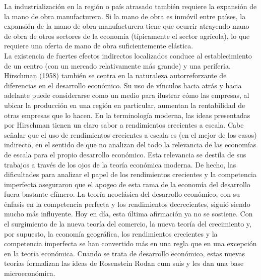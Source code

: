 La industrialización en la región o país atrasado también requiere la expansión de la mano de obra manufacturera. Si la mano de obra es inmóvil entre países, la expansión de la mano de obra manufacturera tiene que ocurrir atrayendo mano de obra de otros sectores de la economía (típicamente el sector agrícola), lo que requiere una oferta de mano de obra suficientemente elástica. \\
La existencia de fuertes efectos indirectos localizados conduce al establecimiento de un centro (con un mercado relativamente más grande) y una periferia. Hirschman (1958) también se centra en la naturaleza autorreforzante de diferencias en el desarrollo económico. Su uso de vínculos hacia atrás y hacia adelante puede considerarse como un medio para ilustrar cómo las empresas, al ubicar la producción en una región en particular, aumentan la rentabilidad de otras empresas que lo hacen. En la terminología moderna, las ideas presentadas por Hirschman tienen un claro sabor a rendimientos crecientes a escala. Cabe señalar  que el uso de rendimientos crecientes a escala es (en el mejor de los casos) indirecto, en el sentido de que no analizan del todo la relevancia de las economías de escala para el propio desarrollo económico. Esta relevancia se destila de sus trabajos a través de los ojos de la teoría económica moderna. De hecho, las dificultades para analizar el papel de los rendimientos crecientes y la competencia imperfecta aseguraron que el apogeo de esta rama de la economía del desarrollo fuera bastante efímero. La teoría neoclásica del desarrollo económico, con su énfasis en la competencia perfecta y los rendimientos decrecientes, siguió siendo mucho más influyente. Hoy en día, esta última afirmación ya no se sostiene. Con el surgimiento de la nueva teoría del comercio, la nueva teoría del crecimiento y, por supuesto, la economía geográfica, los rendimientos crecientes y la competencia imperfecta se han convertido más en una regla que en una excepción en la teoría económica. Cuando se trata de desarrollo económico, estas nuevas teorías formalizan las ideas de Rosenstein Rodan cum suis y les dan una base microeconómica.

